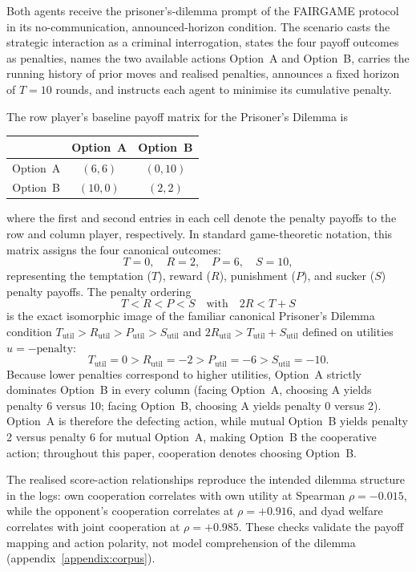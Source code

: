 \documentclass[openacc]{rsproca_new}
\begin{document}
Both agents receive the prisoner's-dilemma prompt of the FAIRGAME
protocol~\cite{buscemi2025fairgame} in its no-communication, announced-horizon
condition. The scenario casts the strategic interaction as a criminal
interrogation, states the four payoff outcomes as penalties, names the two
available actions Option~A and Option~B, carries the running history of prior
moves and realised penalties, announces a fixed horizon of $T = 10$ rounds, and
instructs each agent to minimise its cumulative penalty.

The row player's baseline payoff matrix for the Prisoner's Dilemma is
\begin{center}
\small
\begin{tabular}{c|cc}
 & Option~A & Option~B \\
\hline
Option~A & $(6, 6)$ & $(0, 10)$ \\
Option~B & $(10, 0)$ & $(2, 2)$
\end{tabular}
\end{center}
where the first and second entries in each cell denote the penalty payoffs to
the row and column player, respectively. In standard game-theoretic notation,
this matrix assigns the four canonical outcomes:
\[
T = 0, \quad R = 2, \quad P = 6, \quad S = 10,
\]
representing the temptation ($T$), reward ($R$), punishment ($P$), and sucker
($S$) penalty payoffs. The penalty ordering
\[
T < R < P < S \quad \text{with} \quad 2R < T + S
\]
is the exact isomorphic image of the familiar canonical Prisoner's Dilemma
condition $T_{\text{util}} > R_{\text{util}} > P_{\text{util}} > S_{\text{util}}$
and $2R_{\text{util}} > T_{\text{util}} + S_{\text{util}}$ defined on utilities
$u = -\text{penalty}$:
\[
T_{\text{util}} = 0 > R_{\text{util}} = -2 > P_{\text{util}} = -6 > S_{\text{util}} = -10.
\]
Because lower penalties correspond to higher utilities, Option~A strictly
dominates Option~B in every column (facing Option~A, choosing A yields penalty 6
versus 10; facing Option~B, choosing A yields penalty 0 versus 2). Option~A is
therefore the defecting action, while mutual Option~B yields penalty 2 versus
penalty 6 for mutual Option~A, making Option~B the cooperative action;
throughout this paper, cooperation denotes choosing Option~B.

The realised score-action relationships reproduce the intended dilemma
structure in the logs: own cooperation correlates with own utility at Spearman
$\rho = -0.015$, while the opponent's cooperation correlates at
$\rho = +0.916$, and dyad welfare correlates with joint cooperation at
$\rho = +0.985$. These checks validate the payoff mapping and action polarity,
not model comprehension of the dilemma (appendix~\ref{appendix:corpus}).
\end{document}
